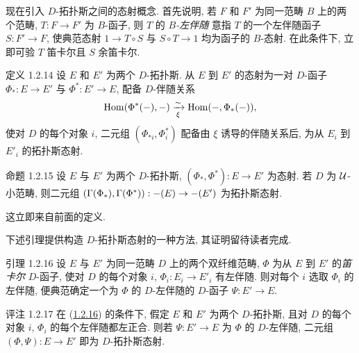 \setcounter{subsection}{2}
\setcounter{subsubsection}{12}



\subsubsection{}
现在引入 $D$-拓扑斯之间的态射概念.
首先说明, 若 $F$ 和 $F'$ 为同一范畴 $B$ 上的两个范畴,
$T:F\to F'$ 为 $B$-函子, 则 $T$ 的 \emph{$B$-左伴随}
意指 $T$ 的一个左伴随函子 $S:F'\to F$,
使典范态射 $1\to T\circ S$ 与 $S\circ T\to1$ 均为函子的 $B$-态射.
在此条件下, 立即可验 $T$ 笛卡尔且 $S$ 余笛卡尔.

\begin{enonce*}{定义 1.2.14}
设\pageoriginale{} $E$ 和 $E'$ 为两个 $D$-拓扑斯.
从 $E$ 到 $E'$ 的态射为一对 $D$-函子 $\Phi_{\ast}:E\to E'$ 与 $\Phi^{\ast}:E'\to E$,
配备 $D$-伴随关系
$$
\operatorname{Hom}(\Phi^{\ast}(-),-)\xrightarrow[\xi]{\sim}
\operatorname{Hom}(-,\Phi_{\ast}(-)),
$$
使对 $D$ 的每个对象 $i$, 二元组 $(\Phi_{\ast i},\Phi_i^{\ast})$
配备由 $\xi$ 诱导的伴随关系后, 为从 $E_i$ 到 $E'_i$ 的拓扑斯态射.
\end{enonce*}

\begin{enonce*}{命题 1.2.15}
设 $E$ 与 $E'$ 为两个 $D$-拓扑斯, $(\Phi_{\ast},\Phi^{\ast}):E\to E'$ 为态射.
若 $D$ 为 ${\mathcal U}$-小范畴, 则二元组
$(\Gamma(\Phi_{\ast}),\Gamma(\Phi^{\ast})):\Ysheaf{\Gamma}(E)\to\Ysheaf{\Gamma}(E')$
为拓扑斯态射.
\end{enonce*}

这立即来自前面的定义.

下述引理提供构造 $D$-拓扑斯态射的一种方法, 其证明留待读者完成.

\begin{enonce*}{引理 1.2.16}
设 $E$ 与 $E'$ 为同一范畴 $D$ 上的两个双纤维范畴,
$\Phi$ 为从 $E$ 到 $E'$ 的\emph{笛卡尔} $D$-函子,
使对 $D$ 的每个对象 $i$, $\Phi_i:E_i\to E'_i$ 有左伴随.
则对每个 $i$ 选取 $\Phi_i$ 的左伴随, 便典范确定一个为 $\Phi$ 的 $D$-左伴随的
$D$-函子 $\Psi:E'\to E$.
\end{enonce*}

\begin{enonce*}[remark]{评注 1.2.17}
在 (\hyperref[Vbis.lem1.2.16]{1.2.16}) 的条件下, 假定 $E$ 和 $E'$ 为两个 $D$-拓扑斯,
且对 $D$ 的每个对象 $i$, $\Phi_i$ 的每个左伴随都左正合.
则若 $\Psi:E'\to E$ 为 $\Phi$ 的 $D$-左伴随,
二元组 $(\Phi,\Psi):E\to E'$ 即为 $D$-拓扑斯态射.
\end{enonce*}

